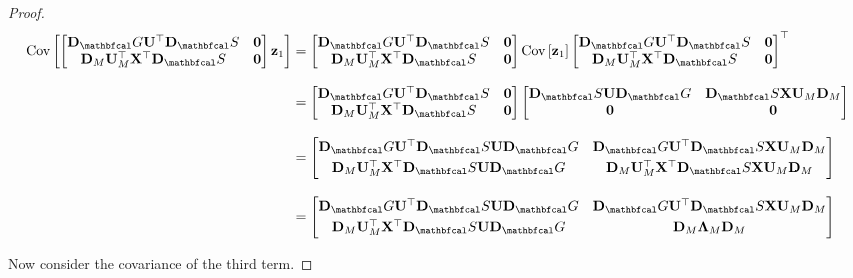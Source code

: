 \begin{proof}
\begin{align*}
    \text{Cov}\left[\begin{bmatrix}
        \D_\Gt \U^\top \D_\St & \zero \\
        \D_M \U_M^\top \X^\top \D_\St & \zero
    \end{bmatrix} \z_1 \right] &= \begin{bmatrix}
        \D_\Gt \U^\top \D_\St & \zero \\
        \D_M \U_M^\top \X^\top \D_\St & \zero
    \end{bmatrix} \text{Cov}\left[ \z_1 \right] \begin{bmatrix}
        \D_\Gt \U^\top \D_\St & \zero \\
        \D_M \U_M^\top \X^\top \D_\St & \zero
    \end{bmatrix}^\top \\[0.3cm]
    &= \begin{bmatrix}
        \D_\Gt \U^\top \D_\St & \zero \\
        \D_M \U_M^\top \X^\top \D_\St & \zero
    \end{bmatrix} \begin{bmatrix}
        \D_\St \U \D_\Gt  &  \D_\St \X \U_M \D_M  \\
         \zero  & \zero
    \end{bmatrix} \\[0.3cm]
    &= \begin{bmatrix}
        \D_\Gt \U^\top \D_\St \U \D_\Gt  &  \D_\Gt \U^\top \D_\St \X \U_M \D_M \\[0.1cm] 
        \D_M \U_M^\top \X^\top \D_\St \U \D_\Gt & \D_M \U_M^\top \X^\top \D_\St \X \U_M \D_M 
        \end{bmatrix} \\[0.3cm]
    &= \begin{bmatrix}
        \D_\Gt \U^\top \D_\St \U \D_\Gt  &  \D_\Gt \U^\top \D_\St \X \U_M \D_M \\[0.1cm] 
        \D_M \U_M^\top \X^\top \D_\St \U \D_\Gt & \D_M \LAM_M \D_M 
        \end{bmatrix} \\
\end{align*}

Now consider the covariance of the third term. 


\end{proof}
